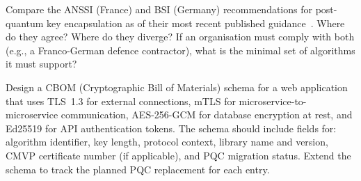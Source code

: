 \begin{prob}
\label{prob:anssi-bsi-comparison}
Compare the ANSSI (France) and BSI (Germany) recommendations for post-quantum key encapsulation as of their most recent published guidance~\cite{ANSSI-PQC2022, BSI-TR-02102}. Where do they agree? Where do they diverge? If an organisation must comply with both (e.g., a Franco-German defence contractor), what is the minimal set of algorithms it must support?
\end{prob}

\begin{prob}
\label{prob:cbom-design}
Design a CBOM (Cryptographic Bill of Materials) schema for a web application that uses TLS~1.3 for external connections, mTLS for microservice-to-microservice communication, AES-256-GCM for database encryption at rest, and Ed25519 for API authentication tokens. The schema should include fields for: algorithm identifier, key length, protocol context, library name and version, CMVP certificate number (if applicable), and PQC migration status. Extend the schema to track the planned PQC replacement for each entry.
\end{prob}

